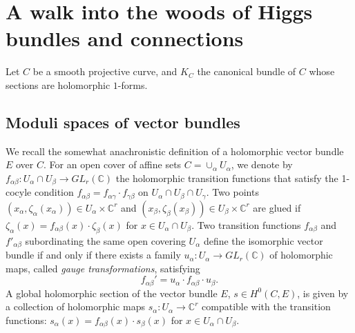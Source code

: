\documentclass[oneside, 11pt]{amsart}
\theoremstyle{definition}
\numberwithin{equation}{subsection}
\def\a{\alpha}
\def\b{\beta}
\begin{document}
  

\section{A walk into the woods of Higgs bundles and connections}\label{section 3}

Let $C$ be a smooth projective curve, 
and $K_C$ the canonical bundle of $C$ whose sections are holomorphic $1$-forms.

\subsection{Moduli spaces of vector bundles}\label{vb} We recall  the somewhat anachronistic 
definition of a holomorphic  vector bundle $E$ over $C$. For an open cover of affine sets $C=\cup_{\a} U_{\a}$, we denote by $f_{\a\b}:U_{\a}\cap U_{\b}\stackrel{}{\rightarrow} GL_{r}(\mathbb{C})$ the holomorphic transition functions that satisfy  the 1-cocyle condition $f_{\a\b}=f_{\a\gamma}\cdot f_{\gamma\b}$ on $U_{\a}\cap U_{\b}\cap U_{\gamma}$. Two points
 $(x_{\a}, \zeta_{\a}(x_{\a}))\in U_{\a}\times \mathbb{C}^r$ and
 $(x_{\b}, \zeta_{\b}(x_{\b}))\in U_{\b}\times \mathbb{C}^r$ are glued
 if $\zeta_{\a}(x)=f_{\a\b}(x)\cdot \zeta_{\b}(x)$ for $x\in U_{\a}\cap U_{\b}$. Two transition functions $f_{\a\b}$ and $f'_{\a\b}$ subordinating  the same open covering $U_{\a}$ define the isomorphic
 vector bundle if and only if there exists a family $u_{\a}:U_{\a}\stackrel{}{\rightarrow} GL_{r}(\mathbb{C})$ of holomorphic maps, called
 \emph{gauge transformations}, satisfying
$$f_{\a\b}'=u_{\a}\cdot f_{\a\b} \cdot u_{\b}.$$ A global holomorphic section of the vector bundle $E$, $s\in H^0(C,E)$, is given by a collection of holomorphic maps $s_{\alpha}:U_{\a}\stackrel{}{\rightarrow} \mathbb{C}^r$ compatible with the transition functions: $s_{\a}(x)=f_{\a\b}(x) \cdot s_{\b}(x)$ for $x\in U_{\a}\cap U_{\b}$. 
\end{document}
